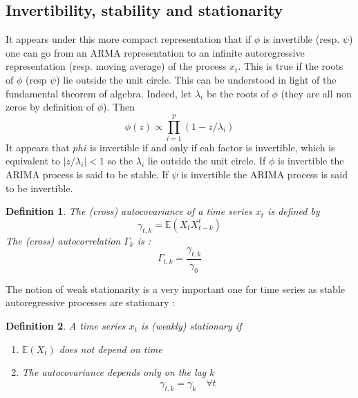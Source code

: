 \documentclass{article}
\newtheorem{Def}{Definition}[section]
\begin{document}
\subsection{Invertibility, stability and stationarity}
It appears under this more compact representation that if $\phi$ is invertible (resp. $\psi$) one can go from an ARMA representation to an infinite autoregressive representation (resp. moving average) of the process $x_t$. This is true if the roots of $\phi$ (resp $\psi$) lie outside the unit circle. This can be understood in light of the fundamental theorem of algebra. Indeed, let $\lambda_i$ be the roots of $\phi$ (they are all non zeros by definition of $\phi$). Then \begin{equation*}
    \phi(z)\propto \prod_{i=1}^{p}(1-z/\lambda_i)
\end{equation*}
It appears that $phi$ is invertible if and only if eah factor is invertible, which is equivalent to $|z/\lambda_i|<1$ so the $\lambda_i$ lie outside the unit circle. \newline 
If $\phi$ is invertible the ARIMA process is said to be stable. If $\psi$ is invertible the ARIMA process is said to be invertible.
\begin{Def}
The (cross) autocovariance of a time series $x_t$ is defined by \begin{equation*}
    \gamma_{t,k}=\mathds{E}(X_tX^{t}_{t-k})
\end{equation*}
The (cross) autocorrelation $\Gamma_k$ is : 
\begin{equation*}
    \Gamma_{t,k}=\frac{\gamma_{t,k}}{\gamma_0}
\end{equation*}
\end{Def}
The notion of weak stationarity is a very important one for time series as stable autoregressive processes are stationary : 
\begin{Def} A time series $x_t$ is (weakly) stationary if
\begin{enumerate}
    \item $\mathds{E}(X_t)$ does not depend on time
    \item The autocovariance depends only on the lag $k$
\begin{equation*}
    \gamma_{t,k}=\gamma_k\quad\forall t
\end{equation*}
\end{enumerate}
\end{Def}
\end{document}
